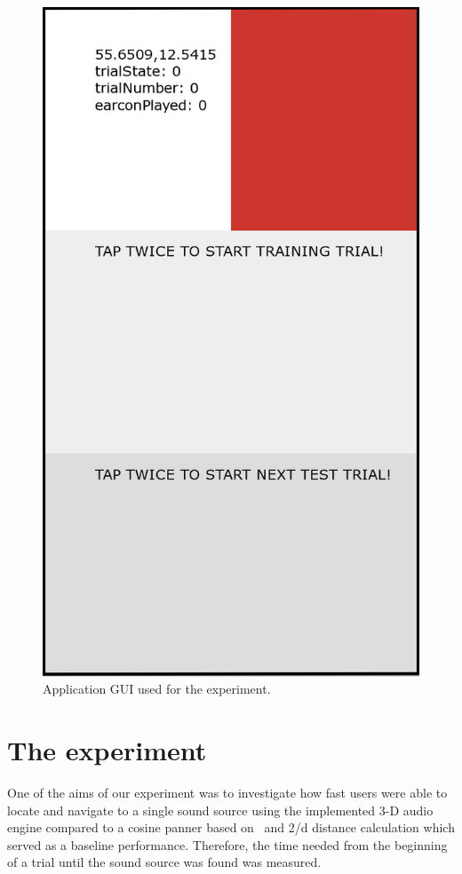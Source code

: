 \documentclass[journal]{IEEEtran}
\begin{document}
\begin{figure}[h!]
\centering 
\includegraphics[scale=0.2]{graphics/GUI.png} 
\caption{Application GUI used for the experiment.} 
\label{fig:gui} 
\end{figure}

\section{The experiment}
One of the aims of our experiment was to investigate how fast users were able to locate and navigate to a single sound source using the implemented 3-D audio engine compared to a cosine panner based on~\cite{AndyFarnell2010} and 2/d distance calculation which served as a baseline performance. Therefore, the time needed from the beginning of a trial until the sound source was found was measured. 
\end{document}
